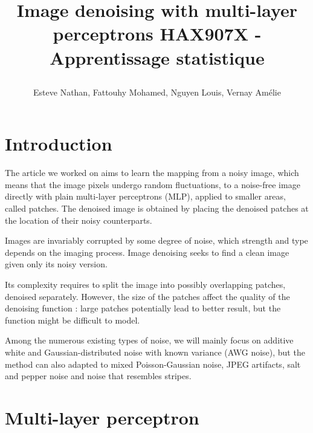 \documentclass[10pt,a4paper]{article}
\author{Esteve Nathan, Fattouhy Mohamed, Nguyen Louis, Vernay Amélie}
\title{%
    \begin{minipage}\linewidth
        \centering
        Image denoising with multi-layer perceptrons
        \vskip3pt
        \large 
        HAX907X - Apprentissage statistique
    \end{minipage}
}
\newcommand{\svs}{\vspace{9pt}}
\begin{document}
\maketitle
\section{Introduction}

The article we worked on \cite{denoise} aims to learn the mapping from a noisy image, which means that the image pixels undergo random fluctuations, to a noise-free image directly with plain multi-layer perceptrons (MLP), applied to smaller areas, called patches. The denoised image is obtained by placing the denoised patches at the location of their noisy counterparts.

\svs

Images are invariably corrupted by some degree of noise, which strength and type depends on the imaging process. Image denoising seeks to find a clean image given only its noisy version.

\svs

Its complexity requires to split the image into possibly overlapping patches, denoised separately.
However, the size of the patches affect the quality of the denoising function : large patches potentially lead to better result, but the function might be difficult to model.

\svs

Among the numerous existing types of noise, we will mainly focus on additive white and Gaussian-distributed noise with known variance (AWG noise), but the method can also adapted to mixed Poisson-Gaussian noise, JPEG artifacts, salt and pepper noise and noise that resembles stripes.

\svs



\svs

\section{Multi-layer perceptron}
\end{document}
